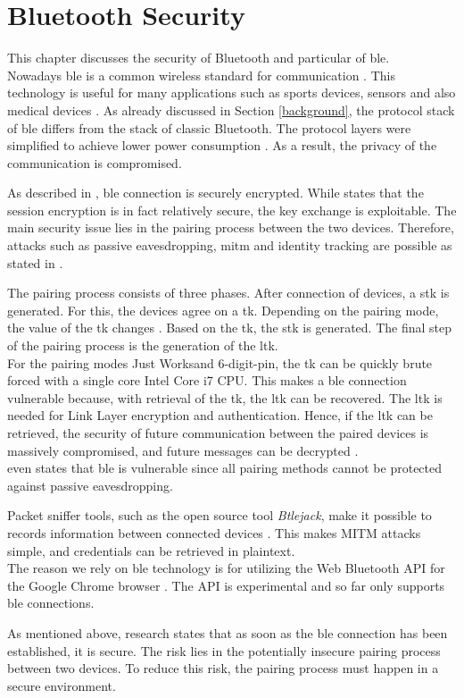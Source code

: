 \section{Bluetooth Security} \label{bluetooth}
This chapter discusses the security of Bluetooth and particular of \gls{ble}. \\
Nowadays \gls{ble} is a common wireless standard for communication \cite{IntroductionBLE}. This technology is useful for many applications such as sports devices, sensors and also medical devices \cite{Ryan13}.
As already discussed in Section \ref{background}, the protocol stack of \gls{ble} differs from the stack of classic Bluetooth. The protocol layers were simplified to achieve lower power consumption \cite{Ryan13}. As a result, the privacy of the communication is compromised.

As described in \cite{GomezOP12}, \gls{ble} connection is securely encrypted. While \cite{Ryan13} states that the session encryption is in fact relatively secure, the key exchange is exploitable. The main security issue lies in the pairing process between the two devices. Therefore, attacks such as passive eavesdropping, \gls{mitm} and identity tracking are possible as stated in \cite{IntroductionBLE}.

The pairing process consists of three phases. After connection of devices, a \gls{stk} is generated. For this, the devices agree on a \gls{tk}. Depending on the pairing mode, the value of the \gls{tk} changes \cite{Ryan13}. Based on the \gls{tk}, the \gls{stk} is generated. The final step of the pairing process is the generation of the \gls{ltk}. \\
For the pairing modes Just Works\texttrademark and 6-digit-pin, the \gls{tk} can be quickly brute forced with a single core Intel Core i7 CPU. This makes a \gls{ble} connection vulnerable because, with retrieval of the \gls{tk}, the \gls{ltk} can be recovered. The \gls{ltk} is needed for Link Layer encryption and authentication. Hence, if the \gls{ltk} can be retrieved, the security of future communication between the paired devices is massively compromised, and future messages can be decrypted \cite{Ryan13}. \\
\cite{GomezOP12} even states that \gls{ble} is vulnerable since all pairing methods cannot be protected against passive eavesdropping. 

Packet sniffer tools, such as the open source tool \textit{Btlejack}, make it possible to records information between connected devices \cite{BtleJack}. This makes MITM attacks simple, and credentials can be retrieved in plaintext. \\
The reason we rely on \gls{ble} technology is for utilizing the Web Bluetooth API for the Google Chrome browser \cite{WebBTAPI}. The API is experimental and so far only supports \gls{ble} connections. 

As mentioned above, research \cite{Ryan13} states that as soon as the \gls{ble} connection has been established, it is secure. The risk lies in the potentially insecure pairing process between two devices. To reduce this risk, the pairing process must happen in a secure environment.
